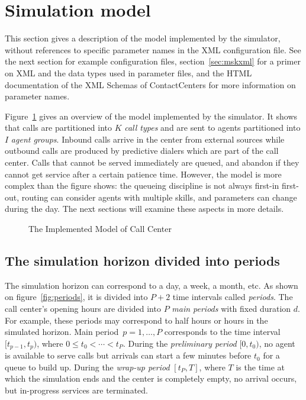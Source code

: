 \section{Simulation model}
\label{sec:mskmodel}

This section gives a description of the model implemented by the
simulator, without references to specific parameter names in the XML
configuration file.
See the next section for example configuration files,
section~\ref{sec:mskxml}
for a primer on XML and the data types used in parameter files,
and
the HTML documentation of the XML Schemas of ContactCenters for more
information on parameter names.

Figure~\ref{fig:ccmodel} gives an overview of the model implemented by
the simulator.  It shows that
calls are partitioned into $K$ \emph{call types} and
are sent to
agents partitioned into $I$ \emph{agent groups}.
Inbound calls arrive in the center from external sources while
outbound calls are produced by predictive dialers which are part of
the call center.
Calls that cannot be served immediately are queued, and abandon
if they cannot get service after a certain patience time.
However, the model is more complex than the figure shows:
the queueing discipline is not always first-in first-out,
routing can consider agents with multiple skills, and
parameters can change during the day.
The next sections will examine these aspects in more details.

\begin{figure}
\centering

\caption{The Implemented Model of Call Center}
\label{fig:ccmodel}
\end{figure}

\subsection{The simulation horizon divided into periods}
\label{sec:periods}

The simulation horizon can correspond to a day, a week, a month, etc.
As shown on figure~\ref{fig:periods},
it is divided into $P+2$ time
intervals called \emph{periods}.
The call center's opening hours are divided into $P$ \emph{main periods}
with fixed duration $d$.
For example, these periods may correspond to
half hours or hours in
the simulated horizon.
Main period~$p=1,\ldots,P$ corresponds to the
time interval $[t_{p-1}, t_p)$, where $0 \le t_0 < \cdots < t_P$.
During the \emph{preliminary period} $[0, t_0)$, no agent is available
to serve calls but arrivals can start a few minutes before $t_0$ for a
queue to build up.
During the \emph{wrap-up period} $[t_P, T]$, where $T$ is the time at
which the simulation ends and the center is completely empty, no
arrival occurs, but in-progress services are terminated.

